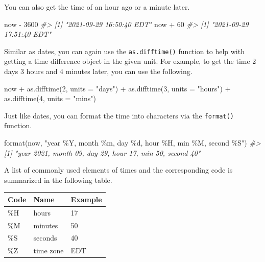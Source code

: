 \documentclass[
]{book}
\newenvironment{Shaded}{\begin{snugshade}}{\end{snugshade}}
\newcommand{\AttributeTok}[1]{\textcolor[rgb]{0.77,0.63,0.00}{#1}}
\newcommand{\CommentTok}[1]{\textcolor[rgb]{0.56,0.35,0.01}{\textit{#1}}}
\newcommand{\DecValTok}[1]{\textcolor[rgb]{0.00,0.00,0.81}{#1}}
\newcommand{\FunctionTok}[1]{\textcolor[rgb]{0.00,0.00,0.00}{#1}}
\newcommand{\NormalTok}[1]{#1}
\newcommand{\SpecialCharTok}[1]{\textcolor[rgb]{0.00,0.00,0.00}{#1}}
\newcommand{\StringTok}[1]{\textcolor[rgb]{0.31,0.60,0.02}{#1}}
\begin{document}
You can also get the time of an hour ago or a minute later.

\begin{Shaded}
\begin{Highlighting}[]
\NormalTok{now }\SpecialCharTok{{-}} \DecValTok{3600}
\CommentTok{\#\textgreater{} [1] "2021{-}09{-}29 16:50:40 EDT"}
\NormalTok{now }\SpecialCharTok{+} \DecValTok{60}
\CommentTok{\#\textgreater{} [1] "2021{-}09{-}29 17:51:40 EDT"}
\end{Highlighting}
\end{Shaded}

Similar as dates, you can again use the \texttt{as.difftime()} function to help with getting a time difference object in the given unit. For example, to get the time 2 days 3 hours and 4 minutes later, you can use the following.

\begin{Shaded}
\begin{Highlighting}[]
\NormalTok{now }\SpecialCharTok{+} \FunctionTok{as.difftime}\NormalTok{(}\DecValTok{2}\NormalTok{, }\AttributeTok{units =} \StringTok{"days"}\NormalTok{) }\SpecialCharTok{+} \FunctionTok{as.difftime}\NormalTok{(}\DecValTok{3}\NormalTok{, }\AttributeTok{units =} \StringTok{"hours"}\NormalTok{) }\SpecialCharTok{+} \FunctionTok{as.difftime}\NormalTok{(}\DecValTok{4}\NormalTok{, }\AttributeTok{units =} \StringTok{"mins"}\NormalTok{) }
\end{Highlighting}
\end{Shaded}

Just like dates, you can format the time into characters via the \texttt{format()} function.

\begin{Shaded}
\begin{Highlighting}[]
\FunctionTok{format}\NormalTok{(now, }\StringTok{"year \%Y, month \%m, day \%d, hour \%H, min \%M, second \%S"}\NormalTok{)}
\CommentTok{\#\textgreater{} [1] "year 2021, month 09, day 29, hour 17, min 50, second 40"}
\end{Highlighting}
\end{Shaded}

A list of commonly used elements of times and the corresponding code is summarized in the following table.

\begin{tabular}{l|l|l}
\hline
Code & Name & Example\\
\hline
\%H & hours & 17\\
\hline
\%M & minutes & 50\\
\hline
\%S & seconds & 40\\
\hline
\%Z & time zone & EDT\\
\hline
\end{tabular}
\end{document}
